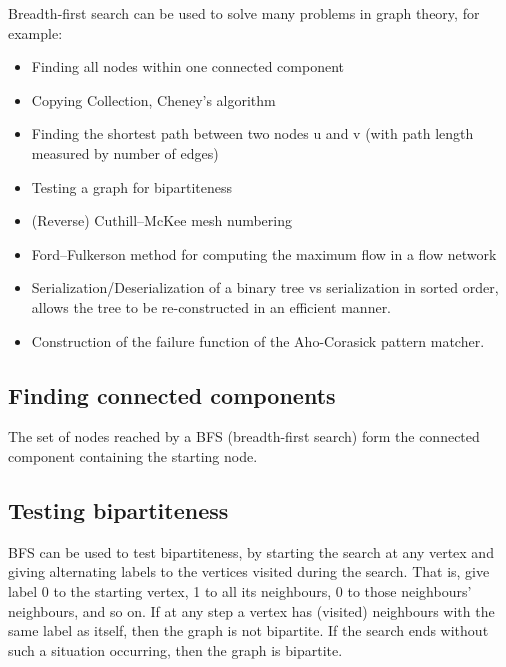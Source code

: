 \documentclass{article}
\begin{document}
Breadth-first search can be used to solve many problems in graph theory, for example:

\begin{itemize}
\item Finding all nodes within one connected component
\item Copying Collection, Cheney's algorithm
\item Finding the shortest path between two nodes u and v (with path length measured by number of edges)
\item Testing a graph for bipartiteness
\item (Reverse) Cuthill–McKee mesh numbering
\item Ford–Fulkerson method for computing the maximum flow in a flow network
\item Serialization/Deserialization of a binary tree vs serialization in sorted order, allows the tree to be re-constructed in an efficient manner.
\item Construction of the failure function of the Aho-Corasick pattern matcher.

\end{itemize}

\subsection{Finding connected components}

The set of nodes reached by a BFS (breadth-first search) form the connected component containing the starting node.

\subsection{Testing bipartiteness    }

BFS can be used to test bipartiteness, by starting the search at any vertex and giving alternating labels to the vertices visited during the search. That is, give label 0 to the starting vertex, 1 to all its neighbours, 0 to those neighbours' neighbours, and so on. If at any step a vertex has (visited) neighbours with the same label as itself, then the graph is not bipartite. If the search ends without such a situation occurring, then the graph is bipartite.
\end{document}
